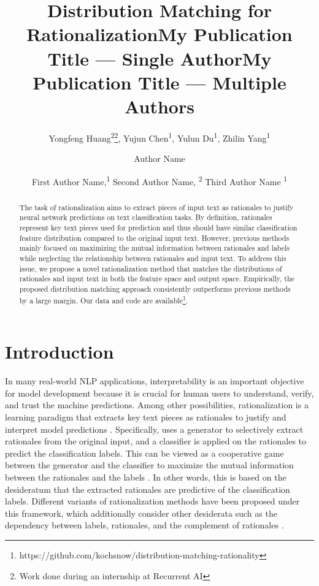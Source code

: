 \documentclass[letterpaper]{article} %
\title{Distribution Matching for Rationalization}
\author{
    Yongfeng Huang\textsuperscript{\rm 2}\footnote{Work done during an internship at Recurrent AI}, Yujun Chen\textsuperscript{\rm 1}, Yulun Du\textsuperscript{\rm 1}, Zhilin Yang\textsuperscript{\rm 1}
    \\
}
\title{My Publication Title --- Single Author}
\author {
    Author Name \\
}
\title{My Publication Title --- Multiple Authors}
\author {
    First Author Name,\textsuperscript{\rm 1}
    Second Author Name, \textsuperscript{\rm 2}
    Third Author Name \textsuperscript{\rm 1} \\
}
\begin{document}
\maketitle

\begin{abstract}
The task of rationalization aims to extract pieces of input text as rationales to justify neural network predictions on text classification tasks. By definition, rationales represent key text pieces used for prediction and thus should have similar classification feature distribution compared to the original input text. However, previous methods mainly focused on maximizing the mutual information between rationales and labels while neglecting the relationship between rationales and input text. To address this issue, we propose a novel rationalization method that matches the distributions of rationales and input text in both the feature space and output space. Empirically, the proposed distribution matching approach consistently outperforms previous methods by a large margin. Our data and code are available\footnote{https://github.com/kochsnow/distribution-matching-rationality}.
\end{abstract}


\section{Introduction}
In many real-world NLP applications, interpretability is an important objective for model development because it is crucial for human users to understand, verify, and trust the machine predictions. Among other possibilities, rationalization is a learning paradigm that extracts key text pieces as rationales to justify and interpret model predictions \cite{lei2016rationalizing}. Specifically, \citet{lei2016rationalizing} uses a generator to selectively extract rationales from the original input, and a classifier is applied on the rationales to predict the classification labels. This can be viewed as a cooperative game between the generator and the classifier to maximize the mutual information between the rationales and the labels \cite{Chen2018LearningTE}. In other words, this is based on the desideratum that the extracted rationales are predictive of the classification labels. Different variants of rationalization methods have been proposed under this framework, which additionally consider other desiderata such as the dependency between labels, rationales, and the complement of rationales \cite{chang2019game,chang2020invariant,yu2019rethinking}.
\end{document}
